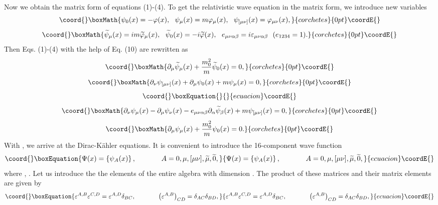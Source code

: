 \documentclass[a4paper,12pt]{article}
\begin{document}
Now we obtain the matrix form of equations (1)-(4). To get the
relativistic wave equation in the matrix form, we introduce new
variables
\[\coord{}\boxMath{
\psi _0 (x)=-\varphi (x) ,~~ \psi _\mu (x)=m\varphi _\mu (x) ,
~~\psi _{[\mu \nu ]}(x)=\varphi _{\mu \nu } (x) ,
}{corchetes}{0pt}\coordE{}\]
\[\coord{}\boxMath{
 \widetilde{\psi }_\mu (x)=im\widetilde{ \varphi }_\mu (x) ,~~
\widetilde{\psi }_0 (x)=-i\widetilde{\varphi } (x) ,~~ e_{\mu \nu
\alpha \beta }=i\varepsilon _{\mu \nu \alpha \beta }~~
(e_{1234}=1).
}{corchetes}{0pt}\coordE{}\]
Then Eqs. (1)-(4) with the help of Eq. (10) are rewritten as
\[\coord{}\boxMath{
\partial _\mu \widetilde{\psi }_\mu (x)+\frac{m_0^2}{m}\widetilde{\psi }_0 (x)=0 ,
}{corchetes}{0pt}\coordE{}\]
\[\coord{}\boxMath{
\partial _\nu \psi _{[\mu \nu ]}(x)+\partial _\mu \psi _0 (x)+m\psi
_\mu (x)=0 ,
}{corchetes}{0pt}\coordE{}\]
\vspace{-8mm}
\begin{equation}\coord{}\boxEquation{  \label{14}
}{  }{ecuacion}\coordE{}\end{equation}
\vspace{-8mm}
\[\coord{}\boxMath{
\partial _\nu \psi _\mu (x)-\partial _\mu \psi _\nu (x)-e_{\mu \nu \alpha \beta
}\partial _\alpha \widetilde{\psi }_\beta (x)+m\psi _{[\mu \nu
]}(x)=0 ,
}{corchetes}{0pt}\coordE{}\]
\[\coord{}\boxMath{
\partial _\mu \psi _\mu (x)+\frac{m_0^2}{m}\psi _0 (x)=0 .
}{corchetes}{0pt}\coordE{}\]
With \coordHE{}, we arrive at the Dirac-K\"ahler equations. It is
convenient to introduce the 16-component wave function
\begin{equation}\coord{}\boxEquation{
\Psi (x)=\left\{ \psi _A (x)\right\} ,\hspace{0.5in}A=0,\mu ,[\mu
\nu ], \widetilde{\mu },\widetilde{0} , \label{15}
}{
\Psi (x)=\left\{ \psi _A (x)\right\} ,\hspace{0.5in}A=0,\mu ,[\mu
\nu ], \widetilde{\mu },\widetilde{0} , }{ecuacion}\coordE{}\end{equation}
where \myHighlight{$\psi _{\widetilde{\mu}}\equiv\widetilde{\psi}_\mu$}\coordHE{}, \coordHE{}. Let us introduce the
the elements of the entire algebra \coordHE{}
\cite{Bogush} with dimension \coordHE{}. The product of these
matrices and their matrix elements are given by
\begin{equation}\coord{}\boxEquation{
\varepsilon ^{A,B}\varepsilon ^{C,D}=\varepsilon ^{A,D}\delta
_{BC} ,\hspace{0.5in}\left( \varepsilon ^{A,B}\right) _{CD}=\delta
_{AC}\delta _{BD} ,\label{16}
}{
\varepsilon ^{A,B}\varepsilon ^{C,D}=\varepsilon ^{A,D}\delta
_{BC} ,\hspace{0.5in}\left( \varepsilon ^{A,B}\right) _{CD}=\delta
_{AC}\delta _{BD} ,}{ecuacion}\coordE{}\end{equation}
\end{document}
